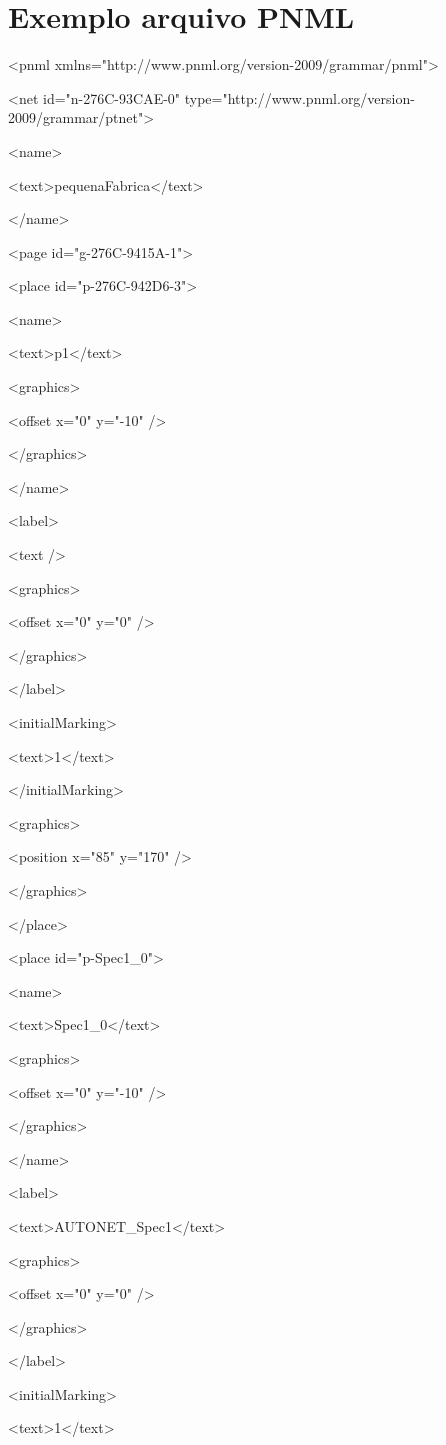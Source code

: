 \chapter{Exemplo arquivo PNML}
<pnml xmlns="http://www.pnml.org/version-2009/grammar/pnml">

<net id="n-276C-93CAE-0" type="http://www.pnml.org/version-2009/grammar/ptnet">

<name>

<text>pequenaFabrica</text>

</name>

<page id="g-276C-9415A-1">

<place id="p-276C-942D6-3">

<name>

<text>p1</text>

<graphics>

<offset x="0" y="-10" />

</graphics>

</name>

<label>

<text />

<graphics>

<offset x="0" y="0" />

</graphics>

</label>

<initialMarking>

<text>1</text>

</initialMarking>

<graphics>

<position x="85" y="170" />

</graphics>

</place>

<place id="p-Spec1\_0">

<name>

<text>Spec1\_0</text>

<graphics>

<offset x="0" y="-10" />

</graphics>

</name>

<label>

<text>AUTONET\_Spec1</text>

<graphics>

<offset x="0" y="0" />

</graphics>

</label>

<initialMarking>

<text>1</text>

